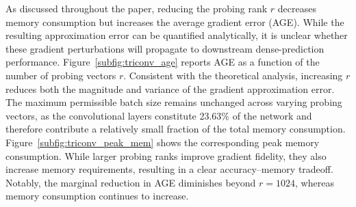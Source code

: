 \documentclass[10pt]{article}
\begin{document}
As discussed throughout the paper, reducing the probing rank $r$ decreases memory consumption but increases the average gradient error (AGE). While the resulting approximation error can be quantified analytically, it is unclear whether these gradient perturbations will propagate to downstream dense-prediction performance. Figure~\ref{subfig:triconv_age} reports AGE as a function of the number of probing vectors $r$. Consistent with the theoretical analysis, increasing $r$ reduces both the magnitude and variance of the gradient approximation error. The maximum permissible batch size remains unchanged across varying probing vectors, as the convolutional layers constitute 23.63\% of the network and therefore contribute a relatively small fraction of the total memory consumption. Figure~\ref{subfig:triconv_peak_mem} shows the corresponding peak memory consumption. While larger probing ranks improve gradient fidelity, they also increase memory requirements, resulting in a clear accuracy--memory tradeoff. Notably, the marginal reduction in AGE diminishes beyond $r=1024$, whereas memory consumption continues to increase.
\end{document}

